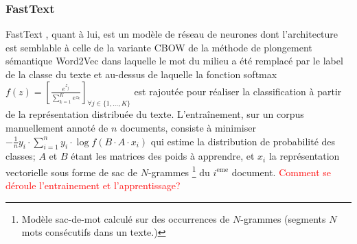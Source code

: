 \subsubsection{FastText}
  
 FastText \citep{grave2017fasttextcls}, quant à lui, est un modèle de réseau de neurones dont l'architecture est semblable à celle de la variante CBOW de la méthode de plongement sémantique Word2Vec \citep{mikolov2013word2vec} dans laquelle le mot du milieu a été remplacé par le label de la classe du texte et au-dessus de laquelle la fonction softmax $f(z) = \left[ \frac{e^{z_j}}{\sum\limits_{k=1}^K e^{z_k}} \right]_{\forall j \in \lbrace 1, ..., K \rbrace} $ est rajoutée pour réaliser la classification à partir de la représentation distribuée du texte. L'entraînement, sur un corpus manuellement annoté de $n$ documents, consiste à minimiser $-\frac{1}{n}y_i \cdot \sum\limits_{i=1}^n y_i \cdot \log{f(B\cdot A\cdot x_i)}$ qui estime la distribution de probabilité des classes; $A$ et $B$ étant les matrices des poids à apprendre, et $x_i$ la représentation vectorielle sous forme de \og sac de $N$-grammes \fg{}\footnote{Modèle sac-de-mot calculé sur des occurrences de $N$-grammes (segments $N$ mots consécutifs dans un texte.)} du  $i^\text{eme}$ document. \textcolor{red}{Comment se déroule l'entrainement et l'apprentissage?}



